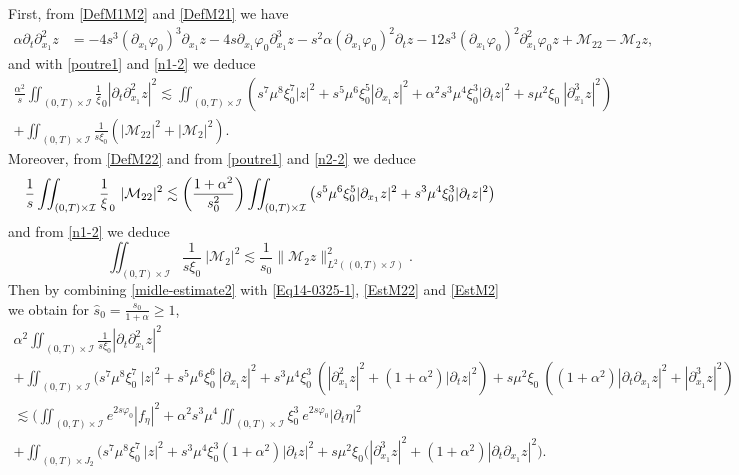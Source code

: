\documentclass[a4paper, 12pt]{article}
\theoremstyle{plain}
\theoremstyle{definition}
\numberwithin{theorem}{section}
\numberwithin{equation}{section}
\begin{document}
{First, from \eqref{DefM1M2} and \eqref{DefM21} we have
\begin{align*}
\alpha\partial_t\partial^2_{x_1}z&=-4s^3(\partial_{x_1}\varphi_0)^3\partial_{x_1}z-4s\partial_{x_1}\varphi_0\partial^3_{x_1}z-s^2\alpha(\partial_{x_1}\varphi_0)^2\partial_tz-12s^3(\partial_{x_1}\varphi_0)^2\partial^2_{x_1}\varphi_0z+\mathcal{M}_{22}-\mathcal{M}_2z,
\end{align*}
and with \eqref{poutre1} and \eqref{n1-2} we deduce
\begin{multline}\label{Eq14-0325-1}
\frac{\alpha^2}{s}\iint_{(0,T)\times\mathcal{I}}\frac1\xi_0|\partial_t\partial^2_{x_1}z|^2\lesssim \iint_{(0,T)\times\mathcal{I}}(s^7\mu^8 \xi_0^7|z|^2+s^5\mu^6 \xi_0^5|\partial_{x_1}z|^2+\alpha^2 s^3\mu^4 \xi_0^3|\partial_tz|^2+s\mu^2 \xi_0~|\partial^3_{x_1}z|^2)\\+\iint_{(0,T)\times\mathcal{I}}\frac{1}{s\xi_0}(|\mathcal{M}_{22}|^2+|\mathcal{M}_{2}|^2).
\end{multline}
Moreover, from \eqref{DefM22} and from \eqref{poutre1} and \eqref{n2-2} we deduce
\begin{equation}\label{EstM22}
\frac1s\iint_{(0,T)\times\mathcal{I}}\frac1\xi_0~|\mathcal{M}_{22}|^2\\
\lesssim \left(\frac{1+\alpha^2}{s_0^2}\right)\iint_{(0,T)\times\mathcal{I}}\left(s^5\mu^6\xi_0^5|\partial_{x_1}z|^2+s^3\mu^4\xi_0^3|\partial_tz|^2\right)
\end{equation}
and from \eqref{n1-2} we deduce
\begin{equation}\label{EstM2}
\iint_{(0,T)\times\mathcal{I}}\frac{1}{s\xi_0}~|\mathcal{M}_{2}|^2\lesssim \frac{1}{s_0}\|\mathcal{M}_2z\|^2_{L^2((0,T)\times\mathcal{I})}.
\end{equation}
Then by combining \eqref{midle-estimate2} with \eqref{Eq14-0325-1}, \eqref{EstM22} and \eqref{EstM2} we obtain for $\widehat{s}_0=\frac{s_0}{1+\alpha}\geq 1$,
\begin{multline}\label{Eqs15-03-2025-0}
\alpha^2\iint_{(0,T)\times\mathcal{I}}\frac{1}{s\xi_0}|\partial_t\partial^2_{x_1}z|^2\\
+ \iint_{(0,T)\times\mathcal{I}} (s^7\mu^8\xi_0^7~|z|^2+s^5\mu^6\xi_0^6~|\partial_{x_1}z|^2+s^3\mu^4\xi_0^3~(|\partial^2_{x_1}z|^2+(1+\alpha^2)|\partial_{t}z|^2)+s\mu^2\xi_0~((1+\alpha^2)|\partial_t\partial_{x_1}z|^2+|\partial_{x_1}^3z|^2)\\
\lesssim \Big(\iint_{(0,T)\times\mathcal{I}}e^{2s\varphi_0}|f_\eta|^2+\alpha^2s^3\mu^4\iint_{(0,T)\times\mathcal{I}}\xi_0^3~e^{2s\varphi_0}|\partial_t \eta|^2\\
+\iint_{(0,T)\times J_2}\Big(s^7\mu^8\xi^7_0~|z|^2+s^3\mu^4\xi_0^3 (1+\alpha^2)|\partial_tz|^2+s\mu^2\xi_0(|\partial^3_{x_1}z|^2+(1+\alpha^2)|\partial_t\partial_{x_1}z|^2\Big).
\end{multline}


}
\end{document}
